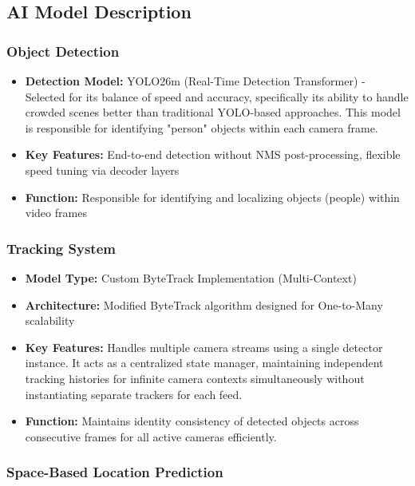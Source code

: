 \subsection{AI Model Description}
\label{subsection:ai-model-description}

\subsubsection{Object Detection}
\label{subsubsection:object-detection}

\begin{itemize}
    \item \textbf{Detection Model:} YOLO26m (Real-Time Detection Transformer) - Selected for its balance of speed and accuracy, specifically its ability to handle crowded scenes better than traditional YOLO-based approaches. This model is responsible for identifying "person" objects within each camera frame.
    \item \textbf{Key Features:} End-to-end detection without NMS post-processing, flexible speed tuning via decoder layers
    \item \textbf{Function:} Responsible for identifying and localizing objects (people) within video frames
\end{itemize}

\subsubsection{Tracking System}
\label{subsubsection:tracking-system}

\begin{itemize}
    \item \textbf{Model Type:} Custom ByteTrack Implementation (Multi-Context)
    \item \textbf{Architecture:} Modified ByteTrack algorithm designed for One-to-Many scalability
    \item \textbf{Key Features:} Handles multiple camera streams using a single detector instance. It acts as a centralized state manager, maintaining independent tracking histories for infinite camera contexts simultaneously without instantiating separate trackers for each feed.
    \item \textbf{Function:} Maintains identity consistency of detected objects across consecutive frames for all active cameras efficiently.
\end{itemize}

\subsubsection{Space-Based Location Prediction}
\label{subsubsection:space-based-matching}

